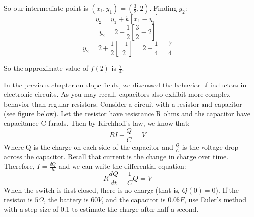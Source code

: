 So our intermediate point is $(x_1, y_1) = (\frac{3}{2}, 2)$. Finding $y_2$:
$$y_2 = y_1 + h \left[x_1 - y_1 \right]$$
$$y_2 = 2 + \frac{1}{2} \left[ \frac{3}{2} - 2 \right]$$
$$y_2 = 2 + \frac{1}{2} \left[\frac{-1}{2} \right] = 2 - \frac{1}{4} 
= \frac{7}{4}$$

So the approximate value of $f(2)$ is $\frac{7}{4}$.

\begin{Exercise}[label = eulercircuit]

In the previous chapter on slope fields, we discussed the behavior of inductors in electronic circuits. As you may recall, capacitors also exhibit more complex behavior than regular resistors. Consider a circuit with a resistor and capacitor (see figure below). Let the resistor have resistance R ohms and the capacitor have capacitance C farads. Then by Kirchhoff's law, we know that:
$$RI + \frac{Q}{C} = V$$
Where Q is the charge on each side of the capacitor and $\frac{Q}{C}$ is the voltage drop across the capacitor. Recall that current is the change in charge over time. Therefore, $I = \frac{dQ}{dt}$ and we can write the differential equation:
$$R \frac{dQ}{dt} + \frac{1}{C}Q = V$$
When the switch is first closed, there is no charge (that is, $Q(0) = 0$). If the resistor is $5 \Omega$, the battery is $60 V$, and the capacitor is $0.05 F$, use Euler's method with a step size of 0.1 to estimate the charge after half a second. 

\end{Exercise}

